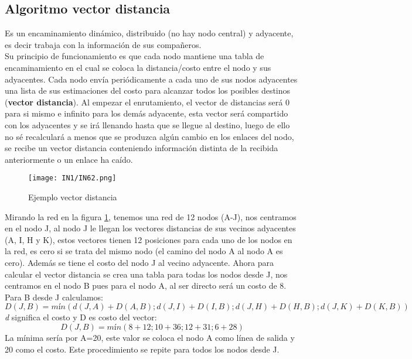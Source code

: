 \documentclass[
	12pt, %
	fleqn, %
	a4paper, %
	oneside, %
]{LegrandOrangeBook}
\begin{document}
\subsection{Algoritmo vector distancia}
Es un encaminamiento dinámico, distribuido (no hay nodo central) y adyacente, es decir trabaja con la información de sus compañeros.\\
Su principio de funcionamiento es que cada nodo mantiene una tabla de encaminamiento en el cual se coloca la distancia/costo entre el nodo y sus adyacentes. Cada nodo envía periódicamente a cada uno de sus nodos adyacentes una lista de sus estimaciones del costo para alcanzar todos los posibles destinos (\textbf{vector distancia}). Al empezar el enrutamiento, el vector de distancias será 0 para si mismo e infinito para los demás adyacente, esta vector será compartido con los adyacentes y se irá llenando hasta que se llegue al destino, luego de ello no sé recalculará a menos que se produzca algún cambio en los enlaces del nodo, se recibe un vector distancia conteniendo información distinta de la recibida anteriormente o un enlace ha caído.
\begin{figure}[H]
\centering
\texttt{[image: IN1/IN62.png]}
\caption{Ejemplo vector distancia}
\label{fig:ejemplo vec dist}
\end{figure}
Mirando la red en la figura \ref{fig:ejemplo vec dist}, tenemos una red de 12 nodos (A-J), nos centramos en el nodo J, al nodo J le llegan los vectores distancias de sus vecinos adyacentes (A, I, H y K), estos vectores tienen 12 posiciones para cada uno de los nodos en la red, es cero si se trata del mismo nodo (el camino del nodo A al nodo A es cero). Además se tiene el costo del nodo J al vecino adyacente. Ahora para calcular el vector distancia se crea una tabla para todas los nodos desde J, nos centramos en el nodo B pues para el nodo A, al ser directo será un costo de 8. Para B desde J calculamos:
\begin{displaymath}
D(J,B)=mín(d(J,A)+D(A,B);d(J,I)+D(I,B);d(J,H)+D(H,B);d(J,K)+D(K,B))
\end{displaymath}
\textit{d} significa el costo y D es costo del vector:
\begin{displaymath}
D(J,B)=mín(8+12;10+36;12+31;6+28)
\end{displaymath}
La mínima sería por A=20, este valor se coloca el nodo A como línea de salida y 20 como el costo. Este procedimiento se repite para todos los nodos desde J.\\
\end{document}

